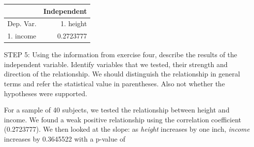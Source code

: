 \documentclass[11pt, chapterprefix=true]{scrbook}\usepackage[]{graphicx}\usepackage[]{color}
\begin{document}
\begin{exercises}
\begin{exercise}
{{\begin{table}[ht]
\begin{tabular}{lr}
    \end{tabular}
    \end{table}
}}

  \vspace{5mm}

    \end{exercise}
    \vspace{2mm}
    \begin{solution}

       \begin{table}[ht]
    \centering
    \begin{tabular}{lr} \hline
        &  \multicolumn{1}{c}{Independent} \\ \hline

    Dep. Var. & 1. height      \\ \hline
    1. income  &   0.2723777      \\ \hline

    \end{tabular}
    \end{table}


    \end{solution}

      \begin{exercise} %


    STEP 5: Using the information from exercise four, describe the results of the independent variable.  Identify variables that we tested, their strength and direction of the relationship.  We should distinguish the relationship in general terms and refer the statistical value in parentheses.  Also not whether the hypotheses were supported.

    \vspace{10mm}

    \end{exercise}
    \vspace{2mm}
    \begin{solution}

    For a sample of 40 subjects, we tested the relationship between height and income.  We found a weak positive relationship using the correlation coefficient (0.2723777).  We then looked at the slope:  as {\textit{height}} increases by one inch, {\textit{income}} increases by 0.3645522 with a p-value of


    \end{solution}

  \begin{exercise} %



\end{exercise}
\end{exercises}
\end{document}
